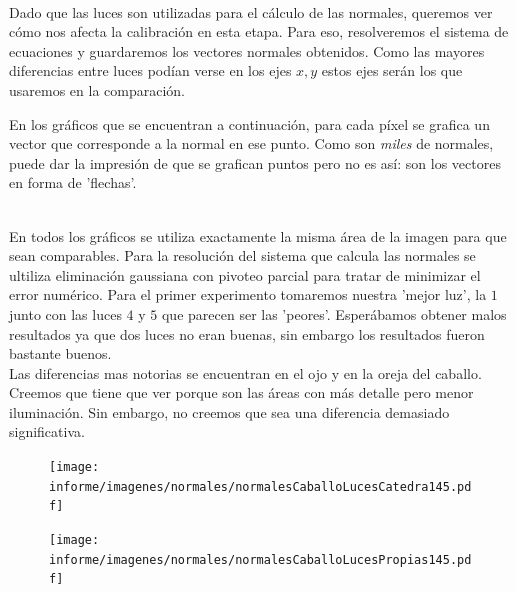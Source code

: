 $ $\newline


Dado que las luces son utilizadas para el cálculo de las normales, queremos ver cómo nos afecta la calibración en esta etapa. Para eso, resolveremos el sistema de ecuaciones y guardaremos los vectores normales obtenidos. Como las mayores diferencias entre luces podían verse en los ejes $x, y$ estos ejes serán los que usaremos en la comparación.

En los gráficos que se encuentran a continuación, para cada píxel se grafica un vector que corresponde a la normal en ese punto. Como son \textit{miles} de normales, puede dar la impresión de que se grafican puntos pero no es así: son los vectores en forma de 'flechas'. \\

$ $\newline

En todos los gráficos se utiliza exactamente la misma área de la imagen para que sean comparables. Para la resolución del sistema que calcula las normales se ultiliza eliminación gaussiana con pivoteo parcial para tratar de minimizar el error numérico. Para el primer experimento tomaremos nuestra 'mejor luz', la $1$ junto con las luces $4$ y $5$ que parecen ser las 'peores'. Esperábamos obtener malos resultados ya que dos luces no eran buenas, sin embargo los resultados fueron bastante buenos. \\

Las diferencias mas notorias se encuentran en el ojo y en la oreja del caballo. Creemos que tiene que ver porque son las áreas con más detalle pero menor iluminación. Sin embargo, no creemos que sea una diferencia demasiado significativa.



\begin{figure}[H]
\centering
\begin{minipage}{.5\textwidth}
    \centering
        \texttt{[image: informe/imagenes/normales/normalesCaballoLucesCatedra145.pdf]}
\end{minipage}%
\begin{minipage}{.5\textwidth}
    \centering
        \texttt{[image: informe/imagenes/normales/normalesCaballoLucesPropias145.pdf]} \\
\end{minipage}
\end{figure}

